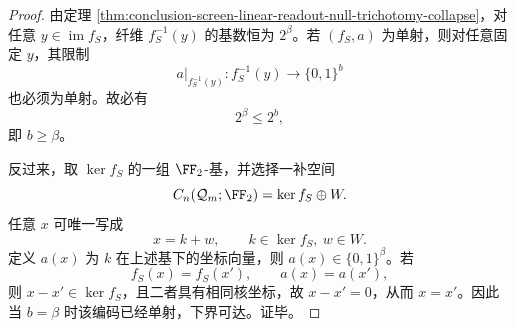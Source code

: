 \begin{proof}
由定理 \ref{thm:conclusion-screen-linear-readout-null-trichotomy-collapse}，对任意 \(y\in \operatorname{im}f_S\)，纤维 \(f_S^{-1}(y)\) 的基数恒为 \(2^\beta\)。若 \((f_S,a)\) 为单射，则对任意固定 \(y\)，其限制
\[
a|_{f_S^{-1}(y)}:f_S^{-1}(y)\to \{0,1\}^b
\]
也必须为单射。故必有
\[
2^\beta\le 2^b,
\]
即 \(b\ge \beta\)。

反过来，取 \(\ker f_S\) 的一组 \(\FF_2\)-基，并选择一补空间
\[
C_n(\mathcal Q_m;\FF_2)=\ker f_S\oplus W.
\]
任意 \(x\) 可唯一写成
\[
x=k+w,
\qquad
k\in \ker f_S,\ w\in W.
\]
定义 \(a(x)\) 为 \(k\) 在上述基下的坐标向量，则 \(a(x)\in \{0,1\}^{\beta}\)。若
\[
f_S(x)=f_S(x'),
\qquad
a(x)=a(x'),
\]
则 \(x-x'\in \ker f_S\)，且二者具有相同核坐标，故 \(x-x'=0\)，从而 \(x=x'\)。因此当 \(b=\beta\) 时该编码已经单射，下界可达。证毕。
\end{proof}

\endinput
